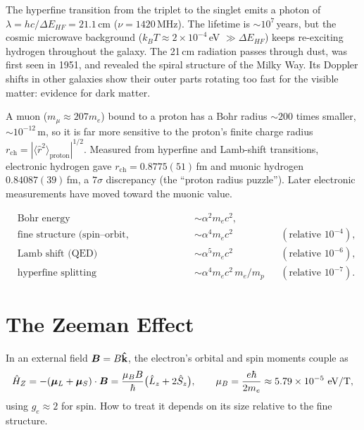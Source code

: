 \begin{fact}
The hyperfine transition from the triplet to the singlet emits a photon of $\lambda = hc/\Delta E_{HF} = 21.1$\,cm ($\nu = 1420$\,MHz). The lifetime is $\sim10^7$\,years, but the cosmic microwave background ($k_BT\approx2\times10^{-4}$\,eV $\gg\Delta E_{HF}$) keeps re-exciting hydrogen throughout the galaxy. The 21\,cm radiation passes through dust, was first seen in 1951, and revealed the spiral structure of the Milky Way. Its Doppler shifts in other galaxies show their outer parts rotating too fast for the visible matter: evidence for dark matter.
\end{fact}

\begin{example}
A muon ($m_\mu\approx207m_e$) bound to a proton has a Bohr radius $\sim200$ times smaller, $\sim10^{-12}$\,m, so it is far more sensitive to the proton's finite charge radius $r_{\text{ch}} = |\langle\hat{r}^2\rangle_{\text{proton}}|^{1/2}$. Measured from hyperfine and Lamb-shift transitions, electronic hydrogen gave $r_{\text{ch}} = 0.8775(51)$\,fm and muonic hydrogen $0.84087(39)$\,fm, a $7\sigma$ discrepancy (the ``proton radius puzzle''). Later electronic measurements have moved toward the muonic value.
\end{example}

\begin{fact}
\begin{align*}
    &\text{Bohr energy} && \sim\alpha^2m_ec^2,\\
    &\text{fine structure (spin--orbit, relativistic)} && \sim\alpha^4m_ec^2 &&(\text{relative }10^{-4}),\\
    &\text{Lamb shift (QED)} && \sim\alpha^5m_ec^2 &&(\text{relative }10^{-6}),\\
    &\text{hyperfine splitting} && \sim\alpha^4m_ec^2\,m_e/m_p &&(\text{relative }10^{-7}).
\end{align*}
\end{fact}

\section{The Zeeman Effect}

In an external field $\vect{B} = B\khat$, the electron's orbital and spin moments couple as
\[
    \hat{H}_Z = -(\bm{\mu}_L + \bm{\mu}_S)\cdot\vect{B} = \frac{\mu_B B}{\hbar}\bigl(\hat{L}_z + 2\hat{S}_z\bigr),
    \qquad
    \mu_B = \frac{e\hbar}{2m_e}\approx5.79\times10^{-5}\ \text{eV/T},
\]
using $g_e\approx2$ for spin. How to treat it depends on its size relative to the fine structure.

